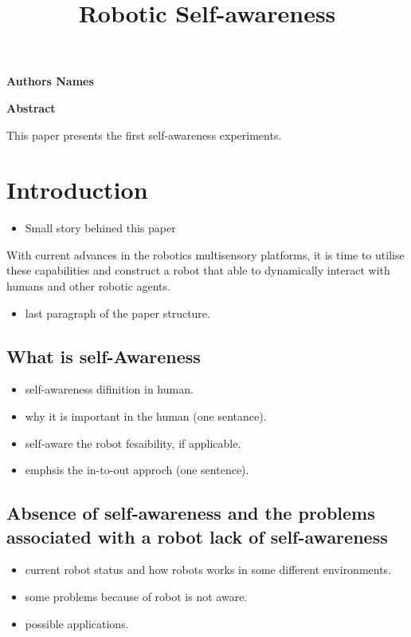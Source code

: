 \documentclass[12pt]{article}
\begin{document}
\title{Robotic Self-awareness}
\maketitle

\begin{center}
    \vspace{0.4cm}
    \textbf{Authors Names}
    
    \vspace{0.9cm}
    \textbf{Abstract}
\end{center}
This paper presents the first self-awareness experiments.
\pagebreak

\section{Introduction}
\begin{itemize}
\item Small story behined this paper
\end{itemize}
With current advances in the robotics multisensory platforms, it is time to utilise these capabilities and construct a robot that able to dynamically interact with humans and other robotic agents.
\begin{itemize}
\item last paragraph of the paper structure.
\end{itemize}
\subsection{What is self-Awareness}
\begin{itemize}
\item self-awareness difinition in human.
\item why it is important in the human (one sentance).
\item self-aware the robot fesaibility, if applicable.
\item emphsis the in-to-out approch (one sentence).
\end{itemize}
\subsection{Absence of self-awareness and the problems associated with a robot lack of self-awareness}
\begin{itemize}
\item current robot status and how robots works in some different environments.
\item some problems because of robot is not aware.
\item possible applications.
\end{itemize}
\end{document}
